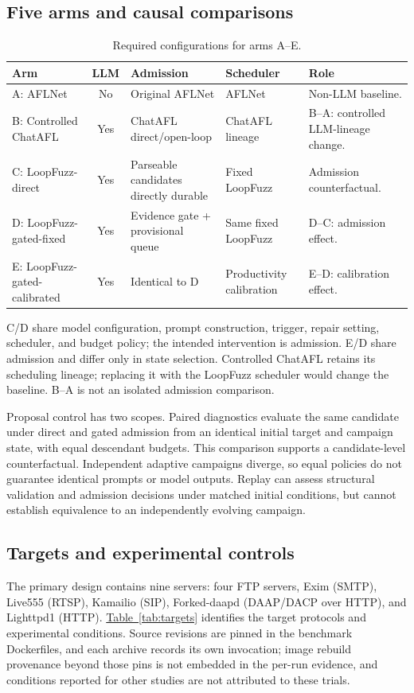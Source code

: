 \documentclass[final,5p,times,number]{elsarticle}
\newcommand{\namedref}[2]{\hyperref[#2]{#1~\ref*{#2}}}
\begin{document}
\subsection{Five arms and causal comparisons}
\begin{table}[!tbp]
\centering\small
\caption{Required configurations for arms A--E.}
\label{tab:arms}
\begin{tabularx}{\textwidth}{l c Y Y Y}
\toprule
Arm & LLM & Admission & Scheduler & Role \\
\midrule
A: AFLNet & No & Original AFLNet & AFLNet & Non-LLM baseline. \\
B: Controlled ChatAFL & Yes & ChatAFL direct/open-loop & ChatAFL lineage & B--A: controlled LLM-lineage change. \\
C: LoopFuzz-direct & Yes & Parseable candidates directly durable & Fixed LoopFuzz & Admission counterfactual. \\
D: LoopFuzz-gated-fixed & Yes & Evidence gate + provisional queue & Same fixed LoopFuzz & D--C: admission effect. \\
E: LoopFuzz-gated-calibrated & Yes & Identical to D & Productivity calibration & E--D: calibration effect. \\
\bottomrule
\end{tabularx}
\end{table}

C/D share model configuration, prompt construction, trigger, repair setting, scheduler, and budget policy; the intended intervention is admission. E/D share admission and differ only in state selection. Controlled ChatAFL retains its scheduling lineage; replacing it with the LoopFuzz scheduler would change the baseline. B--A is not an isolated admission comparison.

Proposal control has two scopes. Paired diagnostics evaluate the same candidate under direct and gated admission from an identical initial target and campaign state, with equal descendant budgets. This comparison supports a candidate-level counterfactual. Independent adaptive campaigns diverge, so equal policies do not guarantee identical prompts or model outputs. Replay can assess structural validation and admission decisions under matched initial conditions, but cannot establish equivalence to an independently evolving campaign.

\subsection{Targets and experimental controls}
The primary design contains nine servers: four FTP servers, Exim (SMTP), Live555 (RTSP), Kamailio (SIP), Forked-daapd (DAAP/DACP over HTTP), and Lighttpd1 (HTTP). \namedref{Table}{tab:targets} identifies the target protocols and experimental conditions. Source revisions are pinned in the benchmark Dockerfiles, and each archive records its own invocation; image rebuild provenance beyond those pins is not embedded in the per-run evidence, and conditions reported for other studies are not attributed to these trials.
\end{document}
